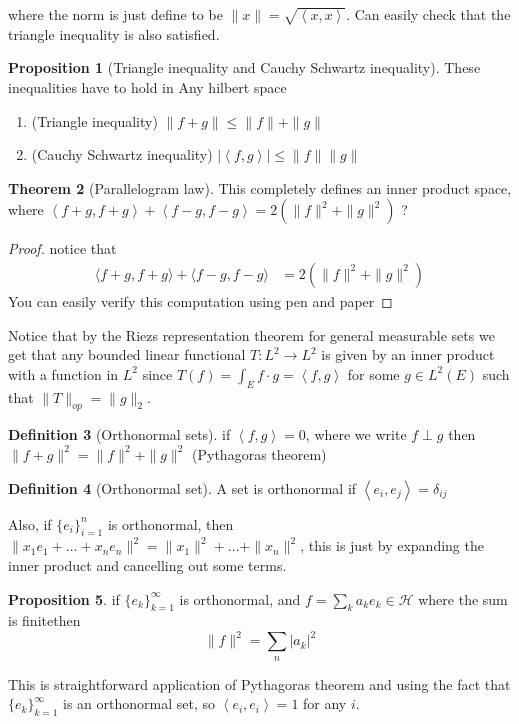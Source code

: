 \documentclass[13pt]{article}
\newcommand{\inprod}[1]{\left\langle #1 \right\rangle}
\theoremstyle{definition} --- default
\newtheorem{theorem}{Theorem}
\newtheorem{proposition}[theorem]{Proposition}
\theoremstyle{definition}
\newtheorem{definition}[theorem]{Definition}
\theoremstyle{remark}
\begin{document}
where the norm is just define to be $\|x\| = \sqrt{\inprod{x,x}}$. Can easily check that the triangle inequality is also satisfied.
\begin{proposition}[Triangle inequality and Cauchy Schwartz inequality]
	These inequalities have to hold in Any hilbert space
	\begin{enumerate}
		\item (Triangle inequality) $\|f + g\| \leq \|f\| + \|g\|$
		\item (Cauchy Schwartz inequality) $|\inprod{f,g}| \leq \|f\|\|g\|$
	\end{enumerate}
\end{proposition}
\begin{theorem}[Parallelogram law]
	This completely defines an inner product space, where $\inprod{f+g,f+g} + \inprod{f-g,f-g} = 2(\|f\|^2 + \|g\|^2)$ ? 	
\end{theorem}
\begin{proof}
    notice that 
    \begin{align*}
        \langle f+g, f+g \rangle + \langle f-g, f-g\rangle &= 2 (\|f\|^2 + \|g\|^2)
    \end{align*}
    You can easily verify this computation using pen and paper
\end{proof}
Notice that by the Riezs representation theorem for general measurable sets we get that any bounded linear functional $T \colon L^2 \to L^2$ is given by an inner product with a function in $L^2$ since $T(f) = \int_E f \cdot g = \inprod{f,g}$ for some $g \in L^2(E)$ such that $\|T\|_{op} = \|g\|_2$. 
\begin{definition}[Orthonormal sets]
	if $\inprod{f,g} = 0$, where we write $f \perp g$ then $\|f+g\|^2 = \|f\|^2 + \|g\|^2$ (Pythagoras theorem)	
\end{definition}
\begin{definition}[Orthonormal set]
	A set is orthonormal if $\inprod{e_i,e_j} = \delta_{ij}$	
\end{definition}
Also, if $\{e_i\}_{i=1}^n$ is orthonormal, then $\|x_1e_1 + \ldots + x_n e_n\|^2 = \|x_1\|^2 + \ldots + \|x_n\|^2$, this is just by expanding the inner product and cancelling out some terms. 
\begin{proposition}
	if $\{e_k\}_{k=1}^\infty$ is orthonormal, and $f = \sum_{k} a_k e_k \in \mathcal{H}$ where the sum is finitethen 
	$$\|f\|^2 = \sum_{n} |a_k|^2$$

\end{proposition}
This is straightforward application of Pythagoras theorem and using the fact that $\{e_k\}_{k=1}^\infty$ is an orthonormal set, so $\inprod{e_i,e_i} = 1$ for any $i$.
\end{document}
